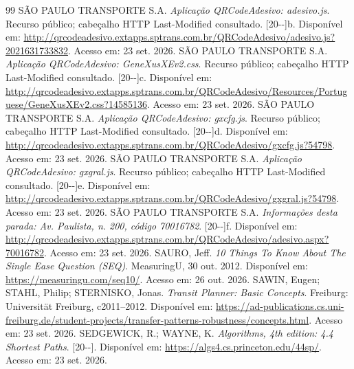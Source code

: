 \documentclass[12pt,oneside,a4paper,brazil,chapter=TITLE]{abntex2}
\begin{document}
\begin{thebibliography}{99}
 SÃO PAULO TRANSPORTE S.A. \textit{Aplicação QRCodeAdesivo: adesivo.js}. Recurso público; cabeçalho HTTP Last-Modified consultado. [20\mbox{-}\mbox{-}]b. Disponível em: \url{http://qrcodeadesivo.extapps.sptrans.com.br/QRCodeAdesivo/adesivo.js?2021631733832}. Acesso em: 23 set. 2026.
 SÃO PAULO TRANSPORTE S.A. \textit{Aplicação QRCodeAdesivo: GeneXusXEv2.css}. Recurso público; cabeçalho HTTP Last-Modified consultado. [20\mbox{-}\mbox{-}]c. Disponível em: \url{http://qrcodeadesivo.extapps.sptrans.com.br/QRCodeAdesivo/Resources/Portuguese/GeneXusXEv2.css?14585136}. Acesso em: 23 set. 2026.
 SÃO PAULO TRANSPORTE S.A. \textit{Aplicação QRCodeAdesivo: gxcfg.js}. Recurso público; cabeçalho HTTP Last-Modified consultado. [20\mbox{-}\mbox{-}]d. Disponível em: \url{http://qrcodeadesivo.extapps.sptrans.com.br/QRCodeAdesivo/gxcfg.js?54798}. Acesso em: 23 set. 2026.
 SÃO PAULO TRANSPORTE S.A. \textit{Aplicação QRCodeAdesivo: gxgral.js}. Recurso público; cabeçalho HTTP Last-Modified consultado. [20\mbox{-}\mbox{-}]e. Disponível em: \url{http://qrcodeadesivo.extapps.sptrans.com.br/QRCodeAdesivo/gxgral.js?54798}. Acesso em: 23 set. 2026.
 SÃO PAULO TRANSPORTE S.A. \textit{Informações desta parada: Av. Paulista, n. 200, código 70016782}. [20\mbox{-}\mbox{-}]f. Disponível em: \url{http://qrcodeadesivo.extapps.sptrans.com.br/QRCodeAdesivo/adesivo.aspx?70016782}. Acesso em: 23 set. 2026.
 SAURO, Jeff. \textit{10 Things To Know About The Single Ease Question (SEQ)}. MeasuringU, 30 out. 2012. Disponível em: \url{https://measuringu.com/seq10/}. Acesso em: 26 out. 2026.
 SAWIN, Eugen; STAHL, Philip; STERNISKO, Jonas. \textit{Transit Planner: Basic Concepts}. Freiburg: Universität Freiburg, c2011--2012. Disponível em: \url{https://ad-publications.cs.uni-freiburg.de/student-projects/transfer-patterns-robustness/concepts.html}. Acesso em: 23 set. 2026.
 SEDGEWICK, R.; WAYNE, K. \textit{Algorithms, 4th edition: 4.4 Shortest Paths}. [20\mbox{-}\mbox{-}]. Disponível em: \url{https://algs4.cs.princeton.edu/44sp/}. Acesso em: 23 set. 2026.

\end{thebibliography}
\end{document}
